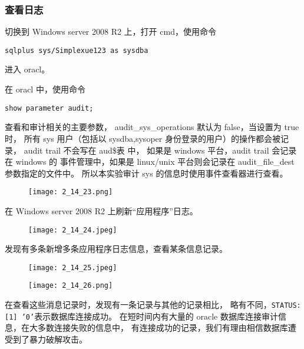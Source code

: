 \subsubsection{查看日志}
切换到 Windows server 2008 R2 上，打开 cmd，使用命令
\begin{verbatim}
sqlplus sys/Simplexue123 as sysdba
\end{verbatim}
进入 oracl。

在 oracl 中，使用命令
\begin{verbatim}
show parameter audit;
\end{verbatim}
查看和审计相关的主要参数，
audit\_sys\_operations 默认为 false，当设置为 true 时，
所有 sys 用户（包括以 sysdba,sysoper 身份登录的用户）的操作都会被记录，
audit trail 不会写在 aud\$表 中，
如果是 windows 平台，audit trail 会记录在 windows 的
事件管理中，如果是 linux/unix 平台则会记录在 audit\_file\_dest 参数指定的文件中。
所以本实验审计 sys 的信息时使用事件查看器进行查看。
\begin{figure}[H]
  \begin{center}
    \texttt{[image: 2\_14\_23.png]}
  \end{center}
\end{figure}

在 Windows server 2008 R2 上刷新``应用程序''日志。
\begin{figure}[H]
  \begin{center}
    \texttt{[image: 2\_14\_24.jpeg]}
  \end{center}
\end{figure}

发现有多条新增多条应用程序日志信息，查看某条信息记录。
\begin{figure}[H]
  \begin{center}
    \texttt{[image: 2\_14\_25.jpeg]}
  \end{center}
\end{figure}
\begin{figure}[H]
  \begin{center}
    \texttt{[image: 2\_14\_26.png]}
  \end{center}
\end{figure}

在查看这些消息记录时，发现有一条记录与其他的记录相比，
略有不同，\texttt{STATUS:[1] '0'}表示数据库连接成功。
在短时间内有大量的 oracle 数据库连接审计信息，在大多数连接失败的信息中，
有连接成功的记录，我们有理由相信数据库遭受到了暴力破解攻击。

